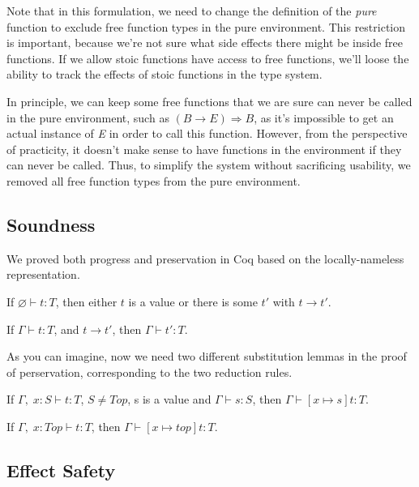 Note that in this formulation, we need to change the definition of the
\emph{pure} function to exclude free function types in the pure
environment. This restriction is important, because we're not sure
what side effects there might be inside free functions. If we allow
stoic functions have access to free functions, we'll loose the ability
to track the effects of stoic functions in the type system.

In principle, we can keep some free functions that we are sure can
never be called in the pure environment, such as
$(B \to E) \Rightarrow B$, as it's impossible to get an actual
instance of \emph{E} in order to call this function. However, from the
perspective of practicity, it doesn't make sense to have functions in
the environment if they can never be called. Thus, to simplify the
system without sacrificing usability, we removed all free function
types from the pure environment.

\subsection{Soundness}

We proved both progress and preservation in Coq based on the
locally-nameless representation.

\begin{theorem}[Progress]
If $\varnothing \vdash t : T$, then either $t$ is a value or there is some
$t'$ with $t \longrightarrow t'$.
\end{theorem}

\begin{theorem}[Preservation]
If $\Gamma \vdash t : T$, and $t \longrightarrow t'$, then $\Gamma
\vdash t' : T$.
\end{theorem}

As you can imagine, now we need two different substitution lemmas in
the proof of perservation, corresponding to the two reduction rules.

\begin{lemma}
  If $\Gamma,\; x:S \vdash t : T$, $S \neq Top$, s is a value and
  $\Gamma \vdash s : S$, then $\Gamma \vdash [x \mapsto s]t : T$.
\end{lemma}

\begin{lemma}
  If $\Gamma,\; x:Top \vdash t : T$, then $\Gamma \vdash [x \mapsto top]t : T$.
\end{lemma}

\subsection{Effect Safety}

